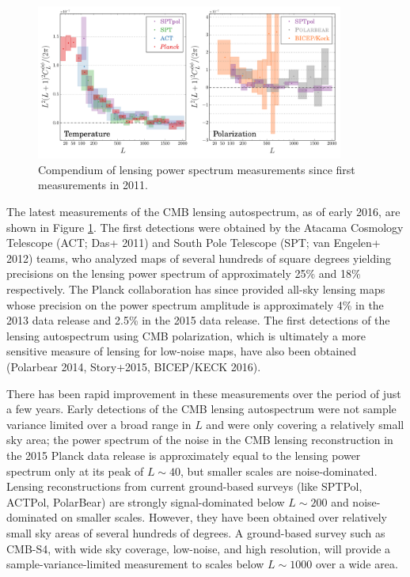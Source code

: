\documentclass{tcibook}
\begin{document}
\begin{figure}[h]
\centering
\includegraphics[width=0.9\textwidth]{autoCompilationTP}
\caption{Compendium of lensing power spectrum measurements since first measurements in 2011.} 
\label{CMBLensPower}
\end{figure}

The latest measurements of the CMB lensing autospectrum, as of early 2016, are shown in Figure \ref{CMBLensPower}. The first detections were obtained by the Atacama Cosmology Telescope (ACT; Das+ 2011) and South Pole Telescope  (SPT; van Engelen+ 2012) teams, who analyzed maps of several hundreds of square degrees yielding precisions on the lensing power spectrum of approximately 25\% and 18\% respectively.  The Planck collaboration has since provided all-sky lensing maps whose precision on the power spectrum amplitude is approximately 4\% in the 2013 data release and 2.5\% in the 2015 data release.  The first detections of the lensing autospectrum using CMB polarization, which is ultimately a more sensitive measure of lensing for low-noise maps,  have also been obtained (Polarbear 2014, Story+2015, BICEP/KECK 2016).

There has been rapid improvement in these measurements over the period of just a few years. 
Early detections of the CMB lensing autospectrum were not sample variance limited over a broad range in $L$ and were only covering a relatively small sky area;  
the  power spectrum of the noise in the CMB lensing reconstruction in the 2015 Planck data release is approximately equal to the lensing power spectrum only at its peak of $L \sim 40$, but smaller scales are noise-dominated. Lensing reconstructions from current ground-based surveys (like SPTPol, ACTPol, PolarBear) 
are strongly signal-dominated below $L \sim 200$ and noise-dominated on smaller scales.  However, they have been obtained over relatively small sky areas of several hundreds of degrees. A ground-based survey such as CMB-S4, with wide sky coverage, low-noise, and high resolution, will provide a sample-variance-limited measurement to scales below $L \sim 1000$ over a wide area.   
 
\end{document}
